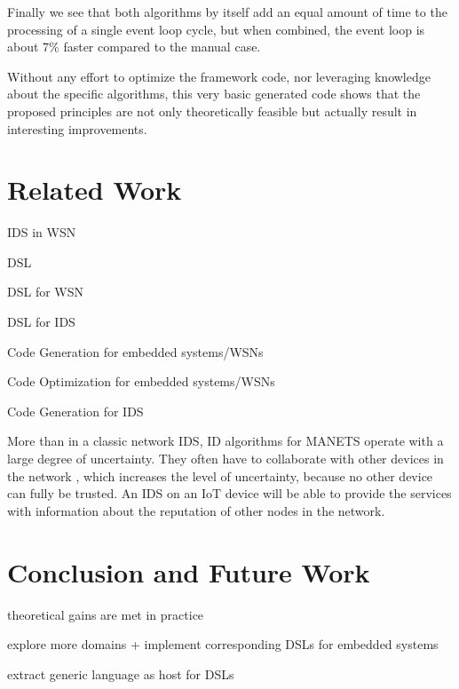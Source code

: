\documentclass[conference]{IEEEtran}
\begin{document}
Finally we see that both algorithms by itself add an equal amount of time to
the processing of a single event loop cycle, but when combined, the event loop
is about 7\% faster compared to the manual case.

Without any effort to optimize the framework code, nor leveraging knowledge
about the specific algorithms, this very basic generated code shows that the
proposed principles are not only theoretically feasible but actually result in
interesting improvements.

\section{Related Work}
\label{related}

IDS in WSN \cite{perrig2004security,mishra2004intrusion}

DSL \cite{fowler2010domain,mernik2005and}

DSL for WSN \cite{naumowicz2009prototyping,levis2004tinyscript}

DSL for IDS \cite{eckmann2002statl}

Code Generation for embedded systems/WSNs \cite{leupers2000code,marwedel2002code}

Code Optimization for embedded systems/WSNs \cite{panda2001data,naik2001software}

Code Generation for IDS \cite{charitakis2003code}


More than in a classic network IDS, ID algorithms for MANETS operate with a
large degree of uncertainty. They often have to collaborate with other devices
in the network \cite{marchang2008collaborative,krontiris2009cooperative}, which
increases the level of uncertainty, because no other device can fully be
trusted. An IDS on an IoT device will be able to provide the services with
information about the reputation \cite{ganeriwal2008reputation} of other nodes
in the network.

\section{Conclusion and Future Work}
\label{conclusion}

theoretical gains are met in practice

explore more domains + implement corresponding DSLs for embedded systems

extract generic language as host for DSLs
\end{document}
